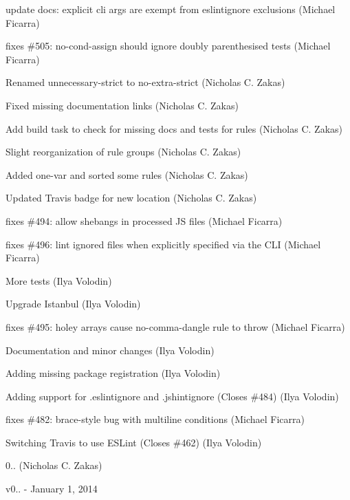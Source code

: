 \begin{DoxyItemize}
\item update docs\+: explicit cli args are exempt from eslintignore exclusions (Michael Ficarra)
\item fixes \#505\+: no-\/cond-\/assign should ignore doubly parenthesised tests (Michael Ficarra)
\item Renamed unnecessary-\/strict to no-\/extra-\/strict (Nicholas C. Zakas)
\item Fixed missing documentation links (Nicholas C. Zakas)
\item Add build task to check for missing docs and tests for rules (Nicholas C. Zakas)
\item Slight reorganization of rule groups (Nicholas C. Zakas)
\item Added one-\/var and sorted some rules (Nicholas C. Zakas)
\item Updated Travis badge for new location (Nicholas C. Zakas)
\item fixes \#494\+: allow shebangs in processed JS files (Michael Ficarra)
\item fixes \#496\+: lint ignored files when explicitly specified via the C\+LI (Michael Ficarra)
\item More tests (Ilya Volodin)
\item Upgrade Istanbul (Ilya Volodin)
\item fixes \#495\+: holey arrays cause no-\/comma-\/dangle rule to throw (Michael Ficarra)
\item Documentation and minor changes (Ilya Volodin)
\item Adding missing package registration (Ilya Volodin)
\item Adding support for .eslintignore and .jshintignore (Closes \#484) (Ilya Volodin)
\item fixes \#482\+: brace-\/style bug with multiline conditions (Michael Ficarra)
\item Switching Travis to use E\+S\+Lint (Closes \#462) (Ilya Volodin)
\item 0.. (Nicholas C. Zakas)
\end{DoxyItemize}

v0.. -\/ January 1, 2014


